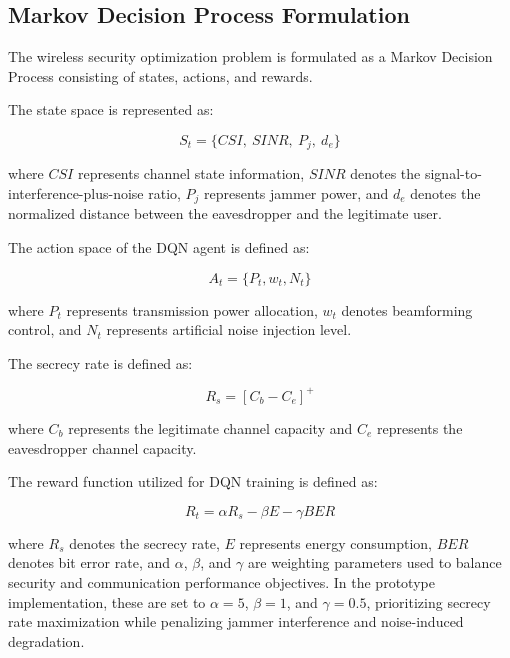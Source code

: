 \documentclass[conference]{IEEEtran}
\begin{document}
\subsection{Markov Decision Process Formulation}

The wireless security optimization problem is formulated as a Markov Decision Process consisting of states, actions, and rewards.

The state space is represented as:

\begin{equation}
S_t = \{CSI,\ SINR,\ P_j,\ d_e\}
\end{equation}

where \(CSI\) represents channel state information, \(SINR\) denotes the signal-to-interference-plus-noise ratio, \(P_j\) represents jammer power, and \(d_e\) denotes the normalized distance between the eavesdropper and the legitimate user.

The action space of the DQN agent is defined as:

\begin{equation}
A_t = \{P_t, w_t, N_t\}
\end{equation}

where \(P_t\) represents transmission power allocation, \(w_t\) denotes beamforming control, and \(N_t\) represents artificial noise injection level.

The secrecy rate is defined as:

\begin{equation}
R_s = [C_b - C_e]^+
\end{equation}

where \(C_b\) represents the legitimate channel capacity and \(C_e\) represents the eavesdropper channel capacity.

The reward function utilized for DQN training is defined as:

\begin{equation}
R_t = \alpha R_s - \beta E - \gamma BER
\end{equation}

where \(R_s\) denotes the secrecy rate, \(E\) represents energy consumption, \(BER\) denotes bit error rate, and \(\alpha\), \(\beta\), and \(\gamma\) are weighting parameters used to balance security and communication performance objectives. In the prototype implementation, these are set to \(\alpha = 5\), \(\beta = 1\), and \(\gamma = 0.5\), prioritizing secrecy rate maximization while penalizing jammer interference and noise-induced degradation.
\end{document}
